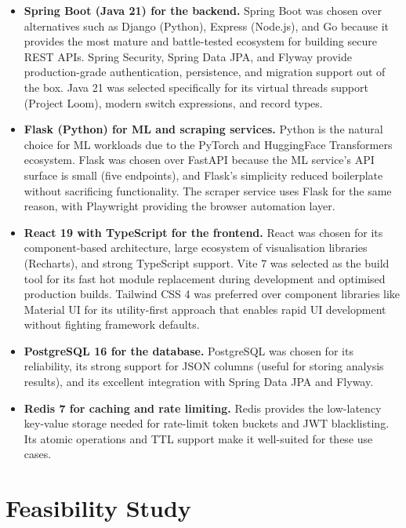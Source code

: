 \documentclass[12pt,a4paper,oneside]{report}
\begin{document}
\begin{itemize}[leftmargin=*]
  \item \textbf{Spring Boot (Java 21) for the backend.} Spring Boot was
        chosen over alternatives such as Django (Python), Express (Node.js),
        and Go because it provides the most mature and battle-tested
        ecosystem for building secure REST APIs. Spring Security, Spring
        Data JPA, and Flyway provide production-grade authentication,
        persistence, and migration support out of the box. Java 21 was
        selected specifically for its virtual threads support (Project
        Loom), modern switch expressions, and record types.
  \item \textbf{Flask (Python) for ML and scraping services.} Python is
        the natural choice for ML workloads due to the PyTorch and
        HuggingFace Transformers ecosystem. Flask was chosen over FastAPI
        because the ML service's API surface is small (five endpoints),
        and Flask's simplicity reduced boilerplate without sacrificing
        functionality. The scraper service uses Flask for the same reason,
        with Playwright providing the browser automation layer.
  \item \textbf{React 19 with TypeScript for the frontend.} React was
        chosen for its component-based architecture, large ecosystem of
        visualisation libraries (Recharts), and strong TypeScript support.
        Vite 7 was selected as the build tool for its fast hot module
        replacement during development and optimised production builds.
        Tailwind CSS 4 was preferred over component libraries like Material
        UI for its utility-first approach that enables rapid UI development
        without fighting framework defaults.
  \item \textbf{PostgreSQL 16 for the database.} PostgreSQL was chosen
        for its reliability, its strong support for JSON columns (useful
        for storing analysis results), and its excellent integration with
        Spring Data JPA and Flyway.
  \item \textbf{Redis 7 for caching and rate limiting.} Redis provides
        the low-latency key-value storage needed for rate-limit token
        buckets and JWT blacklisting. Its atomic operations and TTL
        support make it well-suited for these use cases.
\end{itemize}

\section{Feasibility Study}
\end{document}
